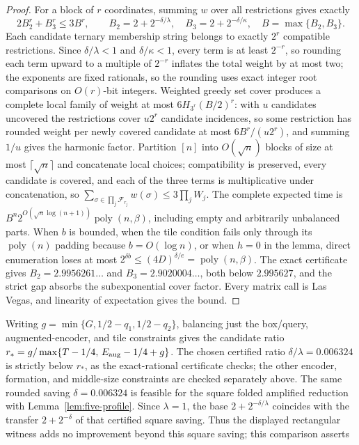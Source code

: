 \documentclass[11pt]{article}
\begin{document}
\begin{proof}
For a block of $r$ coordinates, summing $w$ over all restrictions gives
exactly
\[
 2B_2^r+B_3^r\le3B^r,\qquad B_2=2+2^{-\delta/\lambda},\quad
 B_3=2+2^{-\delta/\kappa},\quad B=\max\{B_2,B_3\}.
\]
Each candidate ternary membership string belongs to exactly $2^r$
compatible restrictions. Since $\delta/\lambda<1$ and $\delta/\kappa<1$,
every term is at least $2^{-r}$, so rounding each term upward to a
multiple of $2^{-r}$ inflates the total weight by at most two; the
exponents are fixed rationals, so the rounding uses exact integer root
comparisons on $O(r)$-bit integers. Weighted greedy set cover produces a
complete local family of weight at most $6H_{3^r}(B/2)^r$: with $u$
candidates uncovered the restrictions cover $u2^r$ candidate incidences,
so some restriction has rounded weight per newly covered candidate at
most $6B^r/(u2^r)$, and summing $1/u$ gives the harmonic factor.
Partition $[n]$ into $O(\sqrt n)$ blocks of size at most
$\lceil\sqrt n\rceil$ and concatenate local choices; compatibility is
preserved, every candidate is covered, and each of the three terms is
multiplicative under concatenation, so
$\sum_{\sigma\in\prod_j\mathcal F_{r_j}}w(\sigma)\le3\prod_jW_j$. The
complete expected time is
$B^n2^{O(\sqrt n\log(n+1))}\operatorname{poly}(n,\beta)$, including
empty and arbitrarily unbalanced parts. When $b$ is bounded, when the
tile condition fails only through its $\operatorname{poly}(n)$ padding
because $b=O(\log n)$, or when $h=0$ in the lemma, direct enumeration
loses at most $2^{\delta b}\le(4D)^{\delta/e}=\operatorname{poly}(n,\beta)$.
The exact certificate gives $B_2=2.9956261\ldots$ and
$B_3=2.9020004\ldots$, both below $2.995627$, and the strict gap absorbs
the subexponential cover factor. Every matrix call is Las Vegas, and
linearity of expectation gives the bound.
\end{proof}
Writing $g=\min\{G,1/2-q_1,1/2-q_2\}$, balancing just the box/query,
augmented-encoder, and tile constraints gives the candidate ratio
$r_*=g/\max\{T-1/4,\,E_{\rm aug}-1/4+g\}$. The chosen certified ratio
$\delta/\lambda=0.006324$ is strictly below $r_*$, as the exact-rational
certificate checks; the other encoder, formation, and middle-size
constraints are checked separately above. The same rounded saving
$\delta=0.006324$ is feasible for the square folded amplified reduction
with Lemma~\ref{lem:five-profile}. Since $\lambda=1$, the base
$2+2^{-\delta/\lambda}$ coincides with the transfer $2+2^{-\delta}$ of
that certified square saving. Thus the displayed rectangular witness
adds no improvement beyond this square saving; this comparison asserts
\end{document}
